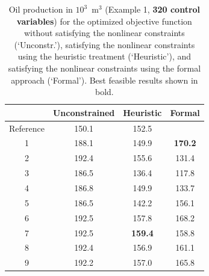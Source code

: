 \documentclass[twocolumn,numbook]{svjour3}          %
\begin{document}
             
\begin{table}
\centering
\caption{Oil production in $10^3$~m$^3$ (Example 1, {\bf 320 control variables}) for the optimized objective function
         without satisfying the nonlinear constraints (`Unconstr.'), satisfying the nonlinear constraints
         using the heuristic treatment (`Heuristic'), and satisfying the nonlinear constraints
         using the formal approach (`Formal'). Best feasible results shown in bold.}
\begin{tabular}{|c|c|c|c|}
\hline
    & Unconstrained & Heuristic & Formal                          \\
\hline
Reference             & 150.1         &  152.5                      &                     \\
1                     & 188.1         &  149.9                      &  \bf{ 170.2 }        \\
2                     & 192.4         &  155.6                      &         131.4            \\
3                     & 186.5         &  136.4                      &         117.8          \\
4                     & 186.8         &  149.9                      &         133.7          \\
5                     & 186.5         &  142.2                      &         156.1          \\
6                     & 192.5         &  157.8                      &         168.2          \\
7                     & 192.5         &  \bf{159.4}               &         158.8          \\ 
8                     & 192.4         &  156.9                      &         161.1          \\
9                     & 192.2         &  157.0                      &         165.8          \\
\hline
\end{tabular}
  \label{table:PiC500Steps64}
\end{table}
 
 
 
 

 
\end{document}
